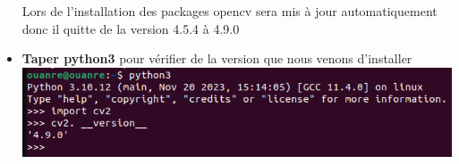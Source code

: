 \documentclass[12pt,a4paper]{article}
\begin{document}
\begin{itemize}
 Lors de l'installation des packages opencv sera mis à jour automatiquement donc il quitte de la version 4.5.4 à 4.9.0
 
\item \textbf{Taper python3} pour vérifier de la version que nous venons d'installer \\

\includegraphics[scale=0.5]{image/verification package opencv.png}\\

\end{itemize}











































\newpage

	
\end{document}
